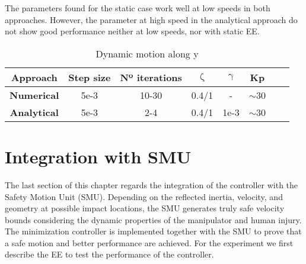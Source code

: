 The parameters found for the static case work well at low speeds in both approaches. However,  the parameter at high speed in the analytical approach do not show good performance neither at low speeds, nor with static EE.

\begin{table}[]
	\centering
	\caption{Dynamic motion along y}
	\label{table:dynamic_opt_values}
	\begin{tabular}{|c|c|c|c|c|c|c|c|}
		\hline
		\textbf{Approach}   & \textbf{Step size} & \textbf{Nº iterations} & \textbf{$\mathrm{\zeta}$}  &  \textbf{$\mathrm{\gamma}$} & \textbf{Kp}  \\ \hline
		\textbf{Numerical}  &  5e-3       & 10-30                          & 0.4/1                  & -         &  ${\sim}$30                          \\  \textbf{Analytical} &   5e-3       & 2-4                             &  0.4/1                  & 1e-3         & ${\sim}$30                         \\ \hline
		
               
	\end{tabular}
\end{table}




\section{Integration with SMU}

The last section of this chapter regards the integration of the controller with the Safety Motion Unit (SMU). Depending on the reflected inertia, velocity, and geometry at possible impact locations, the SMU generates truly safe velocity bounds considering the dynamic properties of the manipulator and human injury. The minimization controller is implemented together with the SMU to prove that a safe motion and better performance are achieved.
For the experiment we first describe the EE to test the performance of the controller.


